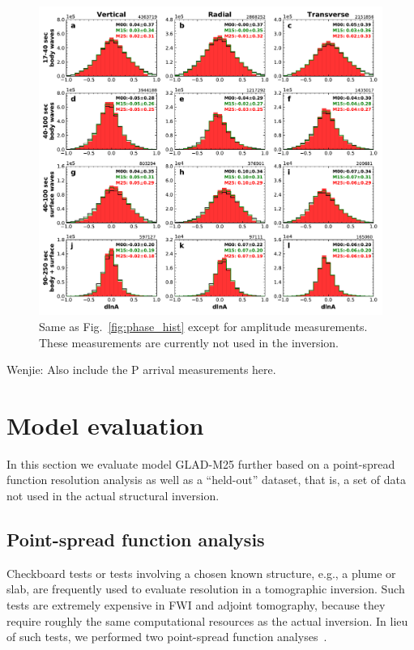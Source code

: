 \documentclass[extra,mreferee]{gji}
\begin{document}
\begin{figure}
  \centering
  \includegraphics[width=\textwidth]{figures/dlna_histogram.pdf}
  \caption{Same as Fig.~\ref{fig:phase_hist} except for amplitude measurements. These measurements are currently not used in the inversion.}
  \label{fig:amp_hist}
\end{figure}

{\color{red} Wenjie: Also include the P arrival measurements here.}

\section{Model evaluation}

In this section we evaluate model GLAD-M25 further based on a point-spread function resolution analysis as well as a ``held-out'' dataset, that is, a set of data not used in the actual structural inversion.

\subsection{Point-spread function analysis}

Checkboard tests or tests involving a chosen known structure, e.g., a plume or slab,
are frequently used to evaluate resolution in a tomographic inversion.
Such tests are extremely expensive in FWI and adjoint tomography, because they require roughly the same computational resources as the actual inversion.
In lieu of such tests,
we performed two point-spread function analyses~\citep{fichtner2011resolution,zhu2015seismic,bozdaug2016global}.
\end{document}

